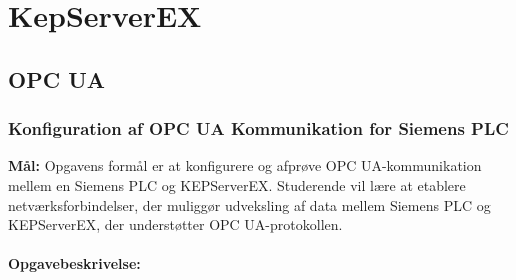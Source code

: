 \chapter{KepServerEX}
\section{OPC UA}
\subsection*{Konfiguration af OPC UA Kommunikation for Siemens PLC}
\label{subsec:opc_ua_comm_siemens}

\textbf{Mål:} Opgavens formål er at konfigurere og afprøve OPC UA-kommunikation mellem en Siemens PLC og KEPServerEX. Studerende vil lære at etablere netværksforbindelser, der muliggør udveksling af data mellem Siemens PLC og KEPServerEX, der understøtter OPC UA-protokollen.
\\\\
\noindent\textbf{Opgavebeskrivelse:}
